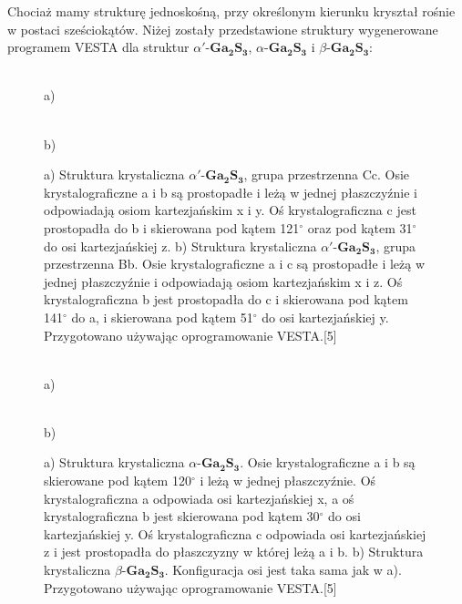 Chociaż mamy strukturę jednoskośną, przy określonym kierunku kryształ rośnie w postaci sześciokątów. Niżej zostały przedstawione struktury wygenerowane programem VESTA dla struktur $\alpha'$-$\mathbf{Ga_{2}S_{3}}$, $\alpha$-$\mathbf{Ga_{2}S_{3}}$ i  $\beta$-$\mathbf{Ga_{2}S_{3}}$:

\begin{center}
	\begin{figure}[H]
		\begin{minipage}[h]{0.47\linewidth}
			 \\a)
		\end{minipage}
		\hfill
		\begin{minipage}[h]{0.47\linewidth}
			 \\b)
		\end{minipage}
		\caption{a) Struktura krystaliczna $\alpha'$-$\mathbf{Ga_{2}S_{3}}$, grupa przestrzenna Cc. Osie krystalograficzne a i b są prostopadłe i leżą w jednej płaszczyźnie i odpowiadają osiom kartezjańskim x i y. Oś krystalograficzna c jest prostopadła do b i skierowana pod kątem 121$^{\circ}$ oraz pod kątem 31$^{\circ}$ do osi kartezjańskiej z. b) Struktura krystaliczna $\alpha'$-$\mathbf{Ga_{2}S_{3}}$, grupa przestrzenna Bb. Osie krystalograficzne a i c są prostopadłe i leżą w jednej płaszczyźnie i odpowiadają osiom kartezjańskim x i z. Oś krystalograficzna b jest prostopadła do c i skierowana pod kątem 141$^{\circ}$ do a, i skierowana pod kątem 51$^{\circ}$ do osi kartezjańskiej y. Przygotowano używając oprogramowanie VESTA.[5]}
	\end{figure}
\end{center}

\begin{center}
	\begin{figure}[H]
		\begin{minipage}[h]{0.47\linewidth}
			 \\a)
		\end{minipage}
		\hfill
		\begin{minipage}[h]{0.47\linewidth}
			 \\b)
		\end{minipage}
		\caption{a) Struktura krystaliczna $\alpha$-$\mathbf{Ga_{2}S_{3}}$. Osie krystalograficzne a i b są skierowane pod kątem 120$^{\circ}$ i leżą w jednej płaszczyźnie. Oś krystalograficzna a odpowiada osi kartezjańskiej x, a oś krystalograficzna b jest skierowana pod kątem 30$^{\circ}$ do osi kartezjańskiej y. Oś krystalograficzna c odpowiada osi kartezjańskiej z i jest prostopadła do płaszczyzny w której leżą a i b. b) Struktura krystaliczna $\beta$-$\mathbf{Ga_{2}S_{3}}$. Konfiguracja osi jest taka sama jak w a). Przygotowano używając oprogramowanie VESTA.[5]}
	\end{figure}
\end{center}
	

